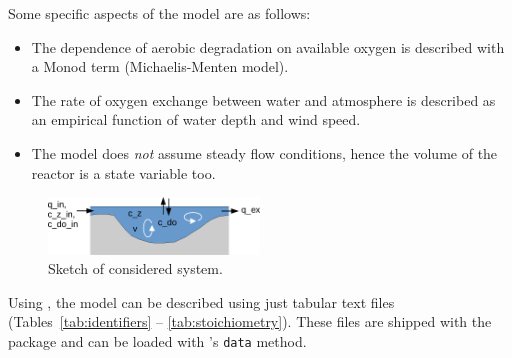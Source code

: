 \documentclass[onecolumn]{article}
\begin{document}
Some specific aspects of the model are as follows:
\begin{itemize}
\item The dependence of aerobic degradation on available oxygen is described with a Monod term (Michaelis-Menten model).
\item The rate of oxygen exchange between water and atmosphere is described as an empirical function of water depth and wind speed.
\item The model does \emph{not} assume steady flow conditions, hence the volume of the reactor is a state variable too.
\end{itemize}

\begin{figure}
\centering
\includegraphics[width=0.5\textwidth]{reactor.pdf}
\caption{Sketch of considered system. \label{fig:reactor}}
\end{figure}

Using , the model can be described using just tabular text files (Tables~\ref{tab:identifiers} -- \ref{tab:stoichiometry}). These files are shipped with the package and can be loaded with 's \verb|data| method.
\end{document}
